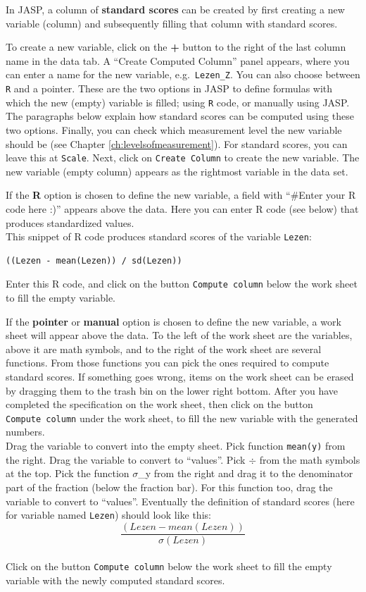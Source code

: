 \documentclass[
]{book}
\begin{document}
In JASP, a column of \textbf{standard scores} can be created by first creating a new variable (column) and subsequently filling that column with standard scores.

To create a new variable, click on the \textbf{+} button to the right of the last column name in the data tab. A ``Create Computed Column'' panel appears, where you can enter a name for the new variable, e.g.~\texttt{Lezen\_Z}. You can also choose between \texttt{R} and a pointer. These are the two options in JASP to define formulas with which the new (empty) variable is filled; using \texttt{R} code, or manually using JASP. The paragraphs below explain how standard scores can be computed using these two options. Finally, you can check which measurement level the new variable should be (see Chapter \ref{ch:levelsofmeasurement}). For standard scores, you can leave this at \texttt{Scale}. Next, click on \texttt{Create\ Column} to create the new variable. The new variable (empty column) appears as the rightmost variable in the data set.

If the \textbf{R} option is chosen to define the new variable, a field with ``\#Enter your R code here :)'' appears above the data. Here you can enter R code (see below) that produces standardized values.\\
This snippet of R code produces standard scores of the variable \texttt{Lezen}:

\begin{verbatim}
((Lezen - mean(Lezen)) / sd(Lezen))
\end{verbatim}

Enter this R code, and click on the button \texttt{Compute\ column} below the work sheet to fill the empty variable.

If the \textbf{pointer} or \textbf{manual} option is chosen to define the new variable, a work sheet will appear above the data. To the left of the work sheet are the variables, above it are math symbols, and to the right of the work sheet are several functions. From those functions you can pick the ones required to compute standard scores. If something goes wrong, items on the work sheet can be erased by dragging them to the trash bin on the lower right bottom. After you have completed the specification on the work sheet, then click on the button \texttt{Compute\ column} under the work sheet, to fill the new variable with the generated numbers.\\
Drag the variable to convert into the empty sheet. Pick function \texttt{mean(y)} from the right.
Drag the variable to convert to ``values''. Pick \(\div\) from the math symbols at the top.
Pick the function \(\sigma\)\_y from the right and drag it to the denominator part of the fraction (below the fraction bar). For this function too, drag the variable to convert to ``values''.
Eventually the definition of standard scores (here for variable named \texttt{Lezen}) should look like this: \[\frac{(Lezen-mean(Lezen))}{\sigma (Lezen)}\]\\
Click on the button \texttt{Compute\ column} below the work sheet to fill the empty variable with the newly computed standard scores.
\end{document}
